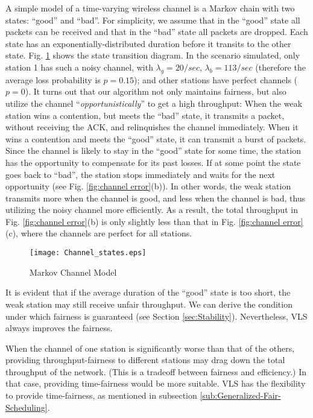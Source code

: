 \documentclass[letterpaper, 10 pt, conference]{ieeeconf}
\begin{document}
A simple model of a time-varying wireless channel is a Markov chain with two
states: {}``good'' and {}``bad''. For simplicity, we assume that
in the {}``good'' state all packets can be received and that in the {}``bad''
state all packets are dropped. Each state has an exponentially-distributed
duration before it transits to the other state. Fig. \ref{fig:Markov-Channel-Model}
shows the state transition diagram. In the scenario simulated, only
station 1 has such a noisy channel, with $\lambda_{g}=20/sec$, $\lambda_{b}=113/sec$
(therefore the average loss probability is $p=0.15$); and other stations
have perfect channels ($p=0$). It turns out that our algorithm not
only maintains fairness, but also utilize the channel {}``\emph{opportunistically}''
to get a high throughput: When the weak station wins a contention,
but meets the {}``bad'' state, it transmits a packet, without receiving
the ACK, and relinquishes the channel immediately. When it wins a
contention and meets the {}``good'' state, it can transmit a burst
of packets. Since the channel is likely to stay in the {}``good''
state for some time, the station has the opportunity to compensate
for its past losses. If at some point the state goes back to {}``bad'',
the station stops immediately and waits for the next opportunity (see
Fig. \ref{fig:channel error}(b)). In other words, the weak station transmits
more when the channel is good, and less when the channel is bad, thus utilizing
the noisy channel more efficiently. As a result, the total throughput
in Fig. \ref{fig:channel error}(b) is only slightly less than that
in Fig. \ref{fig:channel error}(c), where the channels are perfect
for all stations.

\begin{figure}
\noindent \begin{centering}
\texttt{[image: Channel\_states.eps]}
\par\end{centering}


\caption{\label{fig:Markov-Channel-Model}Markov Channel Model}
\end{figure}


It is evident that if the average duration of the {}``good'' state
is too short, the weak station may still receive unfair throughput.
We can derive the condition under which fairness is guaranteed (see
Section \ref{sec:Stability}). Nevertheless, VLS always improves the fairness.

When the channel of one station is significantly worse than that of the others,
providing throughput-fairness to different stations may drag down
the total throughput of the network. (This is a tradeoff between fairness
and efficiency.) In that case, providing time-fairness would be more
suitable. VLS has the flexibility to provide time-fairness, as mentioned
in subsection \ref{sub:Generalized-Fair-Scheduling}.
\end{document}
